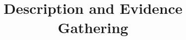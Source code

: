 
\usepackage{tikz}
\usetikzlibrary{shapes,arrows}
\usepackage[normalem]{ulem}

\title{Description and Evidence Gathering}



\date[]{}



\frame{\titlepage}

\frame{\tableofcontents}



\appendix
\frame{}


